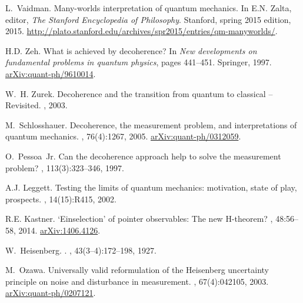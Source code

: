 \documentclass[12pt]{amsart}
\theoremstyle{definition}
\theoremstyle{plain}
\begin{document}
\begin{thebibliography}{10}
L.~Vaidman.
\newblock Many-worlds interpretation of quantum mechanics.
\newblock In E.N. Zalta, editor, {\em The Stanford Encyclopedia of Philosophy}.
  Stanford, spring 2015 edition, 2015.
\newblock
  \href{http://plato.stanford.edu/archives/spr2015/entries/qm-manyworlds/}{http://plato.stanford.edu/archives/spr2015/entries/qm-manyworlds/}.

H.D. Zeh.
\newblock What is achieved by decoherence?
\newblock In {\em New developments on fundamental problems in quantum physics},
  pages 441--451. Springer, 1997.
\newblock \href{http://arxiv.org/abs/quant-ph/9610014}{arXiv:quant-ph/9610014}.

W.~H. Zurek.
\newblock Decoherence and the transition from quantum to classical --
  {R}evisited.
, 2003.

M.~Schlosshauer.
\newblock Decoherence, the measurement problem, and interpretations of quantum
  mechanics.
, 76(4):1267, 2005.
\newblock \href{http://arxiv.org/abs/quant-ph/0312059}{arXiv:quant-ph/0312059}.

O.~Pessoa~Jr.
\newblock Can the decoherence approach help to solve the measurement problem?
, 113(3):323--346, 1997.

A.J. Leggett.
\newblock Testing the limits of quantum mechanics: motivation, state of play,
  prospects.
, 14(15):R415, 2002.

R.E. Kastner.
\newblock `{E}inselection' of pointer observables: {T}he new {H}-theorem?
,
  48:56--58, 2014.
\newblock \href{http://arxiv.org/abs/1406.4126}{arXiv:1406.4126}.

W.~Heisenberg.
.
, 43(3--4):172--198, 1927.

M.~Ozawa.
\newblock Universally valid reformulation of the {H}eisenberg uncertainty
  principle on noise and disturbance in measurement.
, 67(4):042105, 2003.
\newblock \href{http://arxiv.org/abs/quant-ph/0207121}{arXiv:quant-ph/0207121}.


\end{thebibliography}
\end{document}
